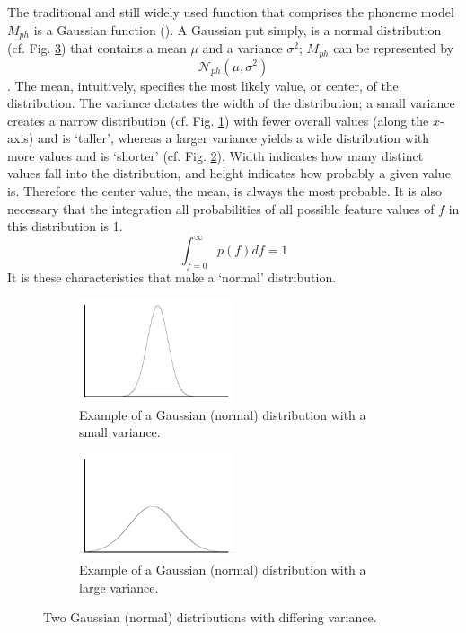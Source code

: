 The traditional and still widely used function that comprises the phoneme model $M_{ph}$ is a Gaussian function (\cite{gales:07}).  A Gaussian put simply, is a normal distribution (cf. Fig. \ref{fig:norm-dist}) that contains a mean $\mu$ and a variance $\sigma^2$; $M_{ph}$ can be represented by \begin{equation} \mathcal{N}_{ph}(\mu,\sigma^2) \end{equation}.  The mean, intuitively, specifies the most likely value, or center, of the distribution.  The variance dictates the width of the distribution; a small variance creates a narrow distribution (cf. Fig. \ref{fig:norm-narrow}) with fewer overall values (along the $x$-axis) and is `taller', whereas a larger variance yields a wide distribution with more values and is `shorter' (cf. Fig. \ref{fig:norm-wide}).  Width indicates how many distinct values fall into the distribution, and height indicates how probably a given value is.  Therefore the center value, the mean, is always the most probable.  It is also necessary that the integration all probabilities of all possible feature values of $f$ in this distribution is 1. \begin{equation} \int_{f=0}^\infty p(f) df = 1 \end{equation}  It is these characteristics that make a `normal' distribution.  
%
\begin{figure}[H!]
\centering
\begin{subfigure}[c!]{0.5\textwidth}
\centering
\includegraphics[width=0.5\textwidth]{figure/norm-narrow.png}
\caption{Example of a Gaussian (normal) distribution with a small variance.}\label{fig:norm-narrow}
\end{subfigure}
\qquad
\begin{subfigure}[c!]{0.5\textwidth}
\centering
\includegraphics[width=0.5\textwidth]{figure/norm-wide.png}
\caption{Example of a Gaussian (normal) distribution with a large variance.}\label{fig:norm-wide}
\end{subfigure}
\caption{Two Gaussian (normal) distributions with differing variance.}\label{fig:norm-dist}
\end{figure}


